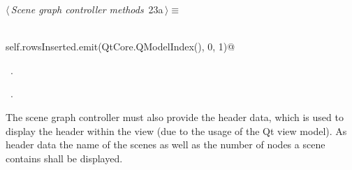 \documentclass[
    a4paper,      %
    10pt,         %
    openright,    %
    notitlepage,  %
    parskip=half, %
]{scrreprt}       %
\theoremstyle{definition}                    %
\begin{document}
\begin{flushleft} \small
\begin{minipage}{\linewidth}\label{scrap17}\raggedright\small
{} $\langle\,${\itshape Scene graph controller methods}\nobreak\ {\footnotesize {23a}}$\,\rangle\equiv$
\vspace{-1ex}
\begin{list}{}{} \item
\mbox{}\lstinline@@\\
\mbox{}\lstinline@    self.rowsInserted.emit(QtCore.QModelIndex(), 0, 1)@\\
\mbox{}\lstinline@@{\NWsep}
\end{list}
\vspace{-1.5ex}
\footnotesize
\begin{list}{}{\setlength{\itemsep}{-\parsep}\setlength{\itemindent}{-\leftmargin}}
\item \NWtxtMacroDefBy\ .
\item \NWtxtMacroRefIn\ .

\item{}
\end{list}
\end{minipage}\vspace{4ex}
\end{flushleft}

The scene graph controller must also provide the header data, which is used to
display the header within the view (due to the usage of the Qt view
model). As header data the name of the
scenes as well as the number of nodes a scene contains shall be displayed.
\end{document}
